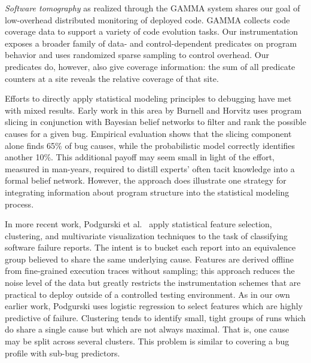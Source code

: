 \documentclass[final]{sigplanconf}
\newcommand{\termdef}[1]{\emph{#1}}
\begin{document}
\termdef{Software tomography} as realized through the GAMMA system
\cite{PASTE'02*2,Orso:2003:LFDIART} shares our goal of low-overhead
distributed monitoring of deployed code.  GAMMA collects code coverage
data to support a variety of code evolution tasks.  Our
instrumentation exposes a broader family of data- and
control-dependent predicates on program behavior and uses randomized
sparse sampling to control overhead.  Our predicates do,
however, also give coverage information: the sum of all predicate counters at a site reveals the relative coverage of that site.

Efforts to directly apply statistical modeling principles to debugging
have met with mixed results.  Early work in this area by Burnell and
Horvitz \cite{Burnell:1995:SCM} uses program slicing in conjunction
with Bayesian belief networks to filter and rank the possible causes
for a given bug.  Empirical evaluation shows that the slicing
component alone finds 65\% of bug causes, while the probabilistic
model correctly identifies another 10\%.  This additional payoff may
seem small in light of the effort, measured in man-years, required to
distill experts' often tacit knowledge into a formal belief network.
However, the approach does illustrate one strategy for integrating
information about program structure into the statistical modeling
process.

In more recent work, Podgurski et al.\ \cite{ICSE`03*465} apply
statistical feature selection, clustering, and multivariate
visualization techniques to the task of classifying software failure
reports.  The intent is to bucket each report into an equivalence
group believed to share the same underlying cause.  Features are
derived offline from fine-grained execution traces without sampling;
this approach reduces the noise level of the data but greatly restricts the
instrumentation schemes that are practical to deploy outside of a
controlled testing environment.  As in our own earlier work, Podgurski
uses logistic regression to select features which are highly
predictive of failure.
Clustering tends to identify small, tight groups of runs which do
share a single cause but which are not always maximal.  That is, one
cause may be split across several clusters.  This problem is similar
to covering a bug profile with sub-bug predictors.
\end{document}
